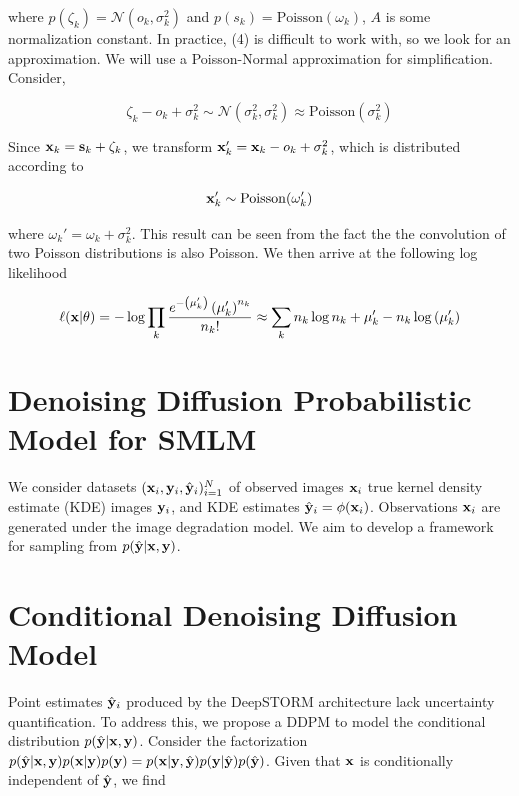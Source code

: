 \documentclass{article}
\begin{document}
where $p(\zeta_{k}) = \mathcal{N}(o_{k},\sigma_{k}^{2})$ and $p(s_{k}) = \mathrm{Poisson}(\omega_{k})$,  $A$ is some normalization constant. In practice, (4) is difficult to work with, so we look for an approximation. We will use a Poisson-Normal approximation for simplification. Consider,

\begin{equation}
\zeta_{k} - o_{k} + \sigma_{k}^{2} \sim \mathcal{N}(\sigma_{k}^{2},\sigma_{k}^{2}) \approx \mathrm{Poisson}(\sigma_{k}^{2})
\end{equation}

Since $\bold{x}_{k} = \bold{s}_{k} + \zeta_{k}$, we transform $\bold{x}_{k}' = \bold{x}_{k} - o_{k} + \sigma_{k}^{2}$, which is distributed according to 

\begin{equation}
\bold{x}_{k}' \sim \mathrm{Poisson}(\omega_{k}')
\end{equation}

where $\omega_{k}' = \omega_{k} + \sigma_{k}^{2}$. This result can be seen from the fact the the convolution of two Poisson distributions is also Poisson. We then arrive at the following log likelihood

\begin{equation}
\ell(\bold{x}|\theta) = -\log \prod_{k} \frac{e^{-\left(\mu_{k}'\right)}\left(\mu_{k}'\right)^{n_{k}}}{n_{k}!}
\approx \sum_{k}  n_{k}\log n_{k} + \mu_{k}' - n_{k}\log\left(\mu_{k}'\right)
\end{equation}


\section{Denoising Diffusion Probabilistic Model for SMLM}

We consider datasets $(\bold{x}_i,\bold{y}_i,\hat{\bold{y}}_{i})_{i=1}^{N}$ of observed images $\bold{x}_i$ true kernel density estimate (KDE) images $\bold{y}_{i}$, and KDE estimates $\hat{\bold{y}}_{i}=\phi(\bold{x}_{i})$. Observations $\bold{x}_i$ are generated under the image degradation model. We aim to develop a framework for sampling from $p(\hat{\bold{y}}|\bold{x},\bold{y})$.

\section{Conditional Denoising Diffusion Model}

Point estimates $\hat{\bold{y}}_{i}$ produced by the DeepSTORM architecture lack uncertainty quantification.  To address this, we propose a DDPM to model the conditional distribution $p(\hat{\bold{y}}|\bold{x},\bold{y})$. Consider the factorization $p(\hat{\bold{y}}|\bold{x},\bold{y})p(\bold{x}|\bold{y})p(\bold{y})=p(\bold{x}|\bold{y},\hat{\bold{y}})p(\bold{y}|\hat{\bold{y}})p(\hat{\bold{y}})$. Given that $\bold{x}$ is conditionally independent of $\hat{\bold{y}}$, we find
\end{document}
